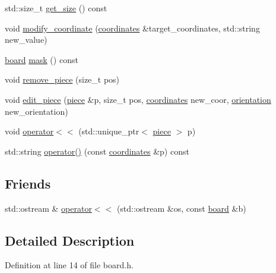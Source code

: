 \begin{DoxyCompactItemize}
\item 
std\+::size\+\_\+t \hyperlink{classbattle__ship_1_1board_aea7bba93d5c16b0c550b5874e0ce04a7}{get\+\_\+size} () const
\item 
void \hyperlink{classbattle__ship_1_1board_a1c79f537306e8f2f84c8aa41a90430e6}{modify\+\_\+coordinate} (\hyperlink{structbattle__ship_1_1coordinates}{coordinates} \&target\+\_\+coordinates, std\+::string new\+\_\+value)
\item 
\hyperlink{classbattle__ship_1_1board}{board} \hyperlink{classbattle__ship_1_1board_a0dd14fd999e0359ad0a3ecee47fe639d}{mask} () const
\item 
void \hyperlink{classbattle__ship_1_1board_a19d236125f444778e5789109d9c1093b}{remove\+\_\+piece} (size\+\_\+t pos)
\item 
void \hyperlink{classbattle__ship_1_1board_ab6dad94144c5142f3b956a78c6810a24}{edit\+\_\+piece} (\hyperlink{classbattle__ship_1_1piece}{piece} \&p, size\+\_\+t pos, \hyperlink{structbattle__ship_1_1coordinates}{coordinates} new\+\_\+coor, \hyperlink{namespacebattle__ship_aed87488f0a73f0d0679fe343fb61c784}{orientation} new\+\_\+orientation)
\item 
void \hyperlink{classbattle__ship_1_1board_af23abad35f41574c7ed00052024ab253}{operator$<$$<$} (std\+::unique\+\_\+ptr$<$ \hyperlink{classbattle__ship_1_1piece}{piece} $>$ p)
\item 
std\+::string \hyperlink{classbattle__ship_1_1board_a6977bbdbc6ed5855ea538dcec5a22699}{operator()} (const \hyperlink{structbattle__ship_1_1coordinates}{coordinates} \&p) const
\end{DoxyCompactItemize}
\subsection*{Friends}
\begin{DoxyCompactItemize}
\item 
std\+::ostream \& \hyperlink{classbattle__ship_1_1board_a1a31fc970cf43cac6d5b1a44e3831f5d}{operator$<$$<$} (std\+::ostream \&os, const \hyperlink{classbattle__ship_1_1board}{board} \&b)
\end{DoxyCompactItemize}


\subsection{Detailed Description}


Definition at line 14 of file board.\+h.



